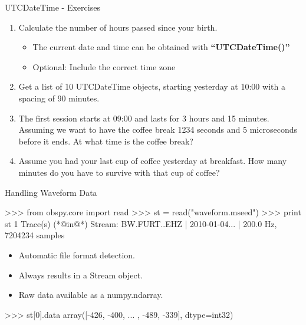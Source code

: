 \begin{frame}{UTCDateTime - Exercises}
    \begin{enumerate}
        \item Calculate the number of hours passed since your birth. \\
            \begin{itemize}
                \item The current date and time can be obtained with \textbf{``UTCDateTime()''}
                \item Optional: Include the correct time zone
            \end{itemize}
        \item Get a list of 10 UTCDateTime objects, starting yesterday at 10:00 with a spacing of 90 minutes.
        \item The first session starts at 09:00 and lasts for 3 hours and 15
            minutes. Assuming we want to have the coffee break 1234 seconds and
            5 microseconds before it ends. At what time is the coffee break?
        \item Assume you had your last cup of coffee yesterday at breakfast.
            How many minutes do you have to survive with that cup of coffee?
    \end{enumerate}


\end{frame}





\begin{frame}{Handling Waveform Data}
\begin{myColorBox}{0.95}{}
\begin{python}
>>> from obspy.core import read
>>> st = read("waveform.mseed")
>>> print st
1 Trace(s) (*@in@*) Stream:
BW.FURT..EHZ | 2010-01-04... | 200.0 Hz, 7204234 samples
\end{python}
\end{myColorBox}
\begin{itemize}
    \item Automatic file format detection.
    \item Always results in a Stream object.
    \item Raw data available as a numpy.ndarray.
\end{itemize}
\begin{myColorBox}{0.95}{}
\begin{python}
>>> st[0].data
array([-426, -400, ... , -489, -339], dtype=int32)
\end{python}
\end{myColorBox}
\end{frame}

